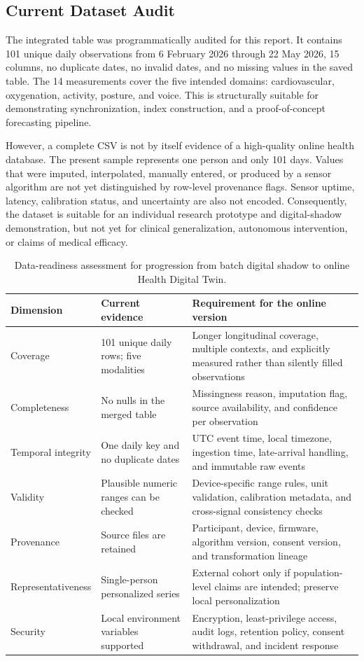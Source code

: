 \documentclass[11pt,a4paper]{article}
\begin{document}
\subsection{Current Dataset Audit}
The integrated table was programmatically audited for this report. It contains 101 unique daily observations from 6 February 2026 through 22 May 2026, 15 columns, no duplicate dates, no invalid dates, and no missing values in the saved table. The 14 measurements cover the five intended domains: cardiovascular, oxygenation, activity, posture, and voice. This is structurally suitable for demonstrating synchronization, index construction, and a proof-of-concept forecasting pipeline.

However, a complete CSV is not by itself evidence of a high-quality online health database. The present sample represents one person and only 101 days. Values that were imputed, interpolated, manually entered, or produced by a sensor algorithm are not yet distinguished by row-level provenance flags. Sensor uptime, latency, calibration status, and uncertainty are also not encoded. Consequently, the dataset is suitable for an individual research prototype and digital-shadow demonstration, but not yet for clinical generalization, autonomous intervention, or claims of medical efficacy.

\begin{table}[H]
\centering
\small
\caption{Data-readiness assessment for progression from batch digital shadow to online Health Digital Twin.}
\begin{tabular}{p{}p{}p{}}
\toprule
Dimension & Current evidence & Requirement for the online version \\
\midrule
Coverage & 101 unique daily rows; five modalities & Longer longitudinal coverage, multiple contexts, and explicitly measured rather than silently filled observations \\
Completeness & No nulls in the merged table & Missingness reason, imputation flag, source availability, and confidence per observation \\
Temporal integrity & One daily key and no duplicate dates & UTC event time, local timezone, ingestion time, late-arrival handling, and immutable raw events \\
Validity & Plausible numeric ranges can be checked & Device-specific range rules, unit validation, calibration metadata, and cross-signal consistency checks \\
Provenance & Source files are retained & Participant, device, firmware, algorithm version, consent version, and transformation lineage \\
Representativeness & Single-person personalized series & External cohort only if population-level claims are intended; preserve local personalization \\
Security & Local environment variables supported & Encryption, least-privilege access, audit logs, retention policy, consent withdrawal, and incident response \\
\bottomrule
\end{tabular}
\end{table}
\end{document}
